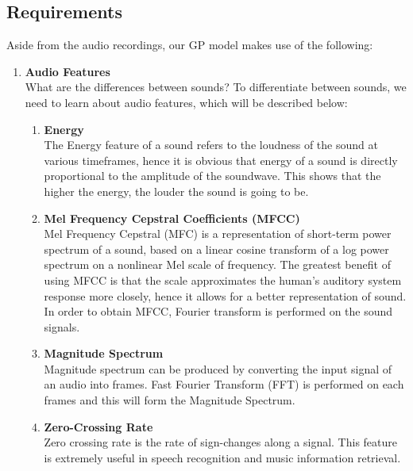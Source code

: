 \documentclass{article}
\begin{document}
	\subsection{Requirements}\label{audio_feats}
	Aside from the audio recordings, our GP model makes use of the following:
	\begin{enumerate}
		\item \textbf{Audio Features}	\\
		What are the differences between sounds? To differentiate between sounds, we need to learn about audio features, which will be described below:
		\begin{enumerate}
			\item \textbf{Energy}	\\
			The Energy feature of a sound refers to the loudness of the sound at various timeframes, 
			hence it is obvious that energy of a sound is directly proportional to the amplitude of the soundwave. 
			This shows that the higher the energy, the louder the sound is going to be.	
		
			\item \textbf{Mel Frequency Cepstral Coefficients (MFCC)} \\
			Mel Frequency Cepstral (MFC) is a representation of short-term power spectrum of a sound, 
			based on a linear cosine transform of a log power spectrum on a nonlinear Mel scale of frequency. 
			The greatest benefit of using MFCC is that the scale approximates the 
			human's auditory system response more closely, hence it allows for a better representation of sound. 
			In order to obtain MFCC, Fourier transform is performed on the sound signals.	
		
			\item \textbf{Magnitude Spectrum} \\
			Magnitude spectrum can be produced by converting the input signal of an audio into frames. 
			Fast Fourier Transform (FFT) is performed on each frames and this will form the Magnitude Spectrum.
			
			\item \textbf{Zero-Crossing Rate} \\
			Zero crossing rate is the rate of sign-changes along a signal. This feature is extremely useful in speech recognition and music information retrieval.
		\end{enumerate}
		

\end{enumerate}
\end{document}

